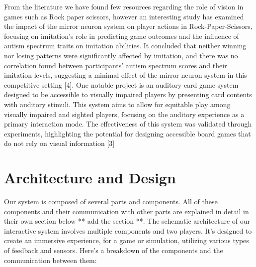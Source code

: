 \documentclass[11pt]{report}
\begin{document}
From the literature we have found few resources regarding the role of vision in games such as Rock paper scissors, however an interesting study has examined the impact of the mirror neuron system on player actions in Rock-Paper-Scissors, focusing on imitation's role in predicting game outcomes and the influence of autism spectrum traits on imitation abilities. It concluded that neither winning nor losing patterns were significantly affected by imitation, and there was no correlation found between participants' autism spectrum scores and their imitation levels, suggesting a minimal effect of the mirror neuron system in this competitive setting [4].
One notable project is an auditory card game system designed to be accessible to visually impaired players by presenting card contents with auditory stimuli. This system aims to allow for equitable play among visually impaired and sighted players, focusing on the auditory experience as a primary interaction mode. The effectiveness of this system was validated through experiments, highlighting the potential for designing accessible board games that do not rely on visual information [3] 

\section*{Architecture and Design}
Our system is composed of several parts and components.
All of these components and their communication with other parts are explained in detail in their own section below ** add the section **.
The schematic architecture of our interactive system involves multiple components and two players. It's designed to create an immersive experience, for a game or simulation, utilizing various types of feedback and sensors. Here's a breakdown of the components and the communication between them:
\end{document}
